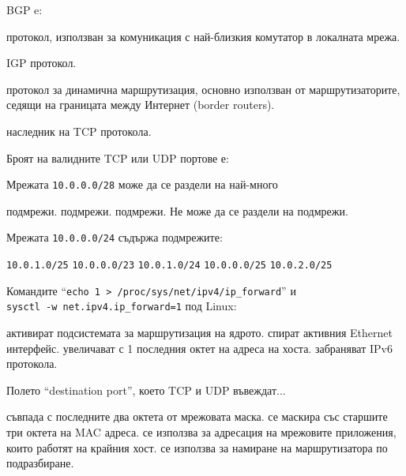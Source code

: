 \begin{questions}
  \question[6] BGP e:
  \begin{choices}
    \choice протокол, използван за комуникация с най-близкия комутатор в
    локалната мрежа.

    \choice IGP протокол.

    \CorrectChoice протокол за динамична маршрутизация, основно използван от
    маршрутизаторите, седящи на границата между Интернет
    (\foreignlanguage{english}{border routers}).

    \choice наследник на TCP протокола.
  \end{choices}

  \question[6] Броят на валидните TCP или UDP портове е:
  \begin{oneparchoices}
  \end{oneparchoices}

  \question[10] Мрежата \texttt{10.0.0.0/28} може да се раздели на най-много
  \begin{choices}
     подмрежи.
     подмрежи.
     подмрежи.
    \choice Не може да се раздели на подмрежи.
  \end{choices}

  \question[10] Мрежата \texttt{10.0.0.0/24} съдържа подмрежите:
  \begin{oneparchoices}
    \choice \texttt{10.0.1.0/25}
    \choice \texttt{10.0.0.0/23}
    \choice \texttt{10.0.1.0/24}
    \CorrectChoice \texttt{10.0.0.0/25}
    \choice \texttt{10.0.2.0/25}
  \end{oneparchoices}

  \question[6] Командите "`\texttt{echo 1 > /proc/sys/net/ipv4/ip\_forward}"' и \\
  \texttt{sysctl -w net.ipv4.ip\_forward=1} под Linux:
  \begin{choices}
    \CorrectChoice активират подсистемата за маршрутизация на ядрото.
    \choice спират активния Ethernet интерфейс.
    \choice увеличават с 1 последния октет на адреса на хоста.
    \choice забраняват IPv6 протокола.
  \end{choices}

  \question[6] Полето "`\foreignlanguage{english}{destination port}"', което TCP
  и UDP въвеждат...
  \begin{choices}
    \choice съвпада с последните два октета от мрежовата маска.
    \choice се маскира със старшите три октета на MAC адреса.
    \CorrectChoice се използва за адресация на мрежовите приложения, които
    работят на крайния хост.
    \choice се използва за намиране на маршрутизатора по подразбиране.
  \end{choices}


\end{questions}
